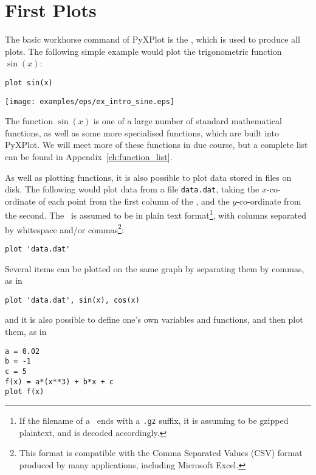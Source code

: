 \section{First Plots}
\label{sec:first_plots}

The basic workhorse command of PyXPlot is the , which is used to
produce all plots. The following simple example would plot the trigonometric
function $\sin(x)$:

\begin{verbatim}
plot sin(x)
\end{verbatim}

\begin{center}
\texttt{[image: examples/eps/ex\_intro\_sine.eps]}
\end{center}

\noindent The function $\sin(x)$ is one of a large number of standard
mathematical functions, as well as some more specialised functions, which are
built into PyXPlot. We will meet more of these functions in due course, but a
complete list can be found in Appendix~\ref{ch:function_list}.

As well as plotting functions, it is also possible to plot data stored in files
on disk. The following would plot data from a file {\tt data.dat}, taking the
$x$-co-ordinate of each point from the first column of the \datafile, and the
$y$-co-ordinate from the second.  The \datafile\ is assumed to be in plain text
format\footnote{If the filename of a \datafile\ ends with a {\tt .gz} suffix,
it is assuming to be gzipped plaintext, and is decoded accordingly.}, with
columns separated by whitespace and/or commas\footnote{This format is
compatible with the Comma Separated Values (CSV) format produced by many
applications, including Microsoft Excel.}:

\begin{verbatim}
plot 'data.dat'
\end{verbatim}

Several items can be plotted on the same graph by separating them by commas, as
in

\begin{verbatim}
plot 'data.dat', sin(x), cos(x)
\end{verbatim}

\noindent and it is also possible to define one's own variables and functions,
and then plot them, as in

\begin{verbatim}
a = 0.02
b = -1
c = 5
f(x) = a*(x**3) + b*x + c
plot f(x)
\end{verbatim}

